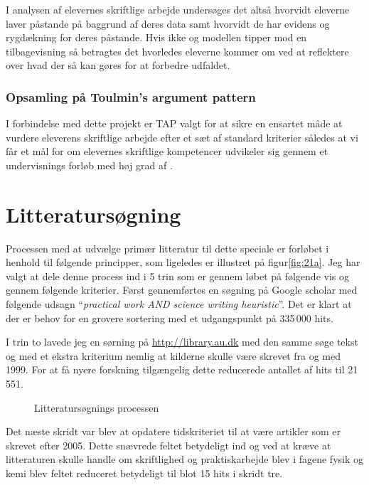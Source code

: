 I analysen af elevernes skriftlige arbejde undersøges det altså hvorvidt eleverne laver påstande på baggrund af deres data samt hvorvidt de har evidens og rygdækning for deres påstande. Hvis ikke og modellen tipper mod en tilbagevisning så betragtes det hvorledes eleverne kommer om ved at reflektere over hvad der så kan gøres for at forbedre udfaldet.

\subsubsection{Opsamling på Toulmin's argument pattern}
I forbindelse med dette projekt er TAP valgt for at sikre en ensartet måde at vurdere eleverens skriftlige arbejde efter et sæt af standard kriterier således at vi får et mål for om elevernes skriftlige kompetencer udvikeler sig gennem et undervisnings forløb med høj grad af \ib{}. 

\section{Litteratursøgning}
\label{sec:lit}

Processen med at udvælge primær litteratur til dette speciale er forløbet i henhold til følgende principper, som ligeledes er illustret på  figur\vref{fig:21a}. Jeg har valgt at dele denne process ind i 5 trin som er gennem løbet på følgende vis og gennem følgende kriterier. Først gennemførtes en søgning på Google scholar med følgende udsagn ``\emph{practical work AND science writing heuristic}''. Det er klart at der er behov for en grovere sortering med et udgangspunkt på 335\,000 hits. 

I trin to lavede jeg en sørning på \url{http://library.au.dk} med den samme søge tekst og med et ekstra kriterium nemlig at kilderne skulle være skrevet fra og med 1999. For at få nyere forskning tilgængelig dette reducerede antallet af hits til 21\,551. 
\begin{figure}
	\centering
	\vspace{-20pt}
	\vspace{0pt}
	\caption{Litteratursøgnings processen}
	\label{fig:21a}
	\vspace{-20pt}
\end{figure}
Det næste skridt var blev at opdatere tidskriteriet til at være artikler som er skrevet efter 2005. Dette snævrede feltet betydeligt ind og ved at kræve at litteraturen skulle handle om skriftlighed og praktiskarbejde blev i fagene fysik og kemi blev feltet reduceret betydeligt til blot 15 hits i skridt tre.

